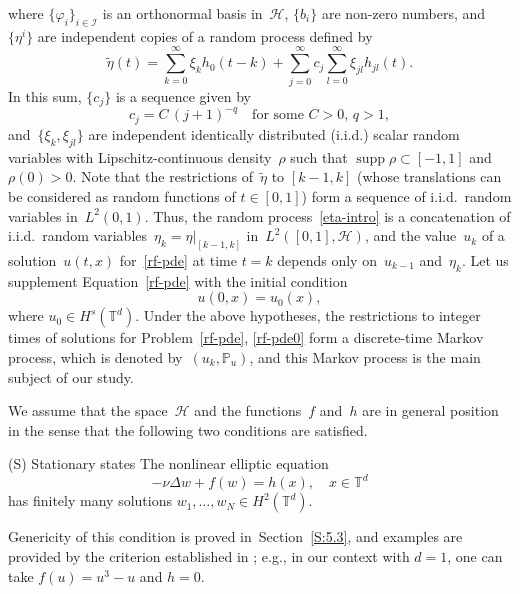 \documentclass[11pt]{article}
\newcommand{\eg}{e.g.,\xspace}
\theoremstyle{plain}
\theoremstyle{definition}
\newtheorem*{namedassumption}{\jepassumptionname}
\newenvironment{enonce*}[1]{\def\jepassumptionname{#1}\begin{namedassumption}}{\end{namedassumption}}
\let\mathcal\mathscr
\theoremstyle{plain}
\numberwithin{equation}{section}
\newcommand{\IP}{{\mathbb P}}
\newcommand{\T}{{\mathbb T}}
\DeclareMathOperator{\supp}{supp}
\newcommand{\HH}{{\mathcal H}}
\newcommand{\II}{{\mathcal I}}
\begin{document}
where $\{\varphi_i\}_{i\in\II}$ is an orthonormal basis in~$\HH$, $\{b_i\}$ are non-zero numbers, and~$\{\eta^i\}$ are independent copies of a random process defined by
\begin{equation} \label{0.3}
\tilde\eta(t)=\sum_{k=0}^\infty \xi_k h_0(t-k)
+\sum_{j=0}^\infty c_j\sum_{l=0}^\infty \xi_{jl}h_{jl}(t).
\end{equation}
In this sum, $\{c_j\}$ is a sequence given by
\begin{equation}\label{cj}
c_j=C\,(j+1)^{-q}\quad \text{for some $C>0$, $q>1$},
\end{equation}
and~$\{\xi_k,\xi_{jl}\}$ are independent identically distributed (i.i.d.) scalar random variables with Lipschitz-continuous density~$\rho$ such that $ \supp\rho\subset[-1,1]$ and $\rho(0)>0$. Note that the restrictions of~$\tilde\eta$ to $[k-1,k]$ (whose translations can be considered as random functions of $t\in[0,1]$) form a sequence of i.i.d.\ random variables in~$L^2(0,1)$. Thus, the random process~\eqref{eta-intro} is a concatenation of i.i.d.\ random variables~$\eta_k=\eta|_{[k-1,k]}$ in~$L^2([0,1],\HH)$, and the value~$u_k$ of a solution~$u(t,x)$ for~\eqref{rf-pde} at time $t=k$ depends only on~$u_{k-1}$ and~$\eta_k$. Let us supplement Equation~\eqref{rf-pde} with the initial condition
\begin{equation}\label{rf-pde0}
u(0,x)=u_0(x),
\end{equation}
where $u_0\in H^s(\T^d)$. Under the above hypotheses, the restrictions to integer times of solutions for Problem~\eqref{rf-pde}, \eqref{rf-pde0} form a discrete-time Markov process, which is denoted by~$(u_k,\IP_u)$, and this Markov process is the main subject of our study.

We assume that the space~$\HH$ and the functions~$f$ and~$h$ are in general position in the sense that the following two conditions are satisfied.
\begin{enonce*}{\hypertarget{S}{(S)} Stationary states}
The nonlinear elliptic equation
\begin{equation} \label{stationary-eq}
-\nu\Delta w+f(w)=h(x), \quad x\in\T^d
\end{equation}
has finitely many solutions $w_1,\dots,w_N\in H^2(\T^d)$.
\end{enonce*}

Genericity of this condition is proved in~Section~\ref{S:5.3}, and examples are provided by the criterion established in \cite[\S 5]{CI-1974}; \eg in our context with $d=1$, one can take $f(u)=u^3-u$ and $h=0$.
\end{document}
